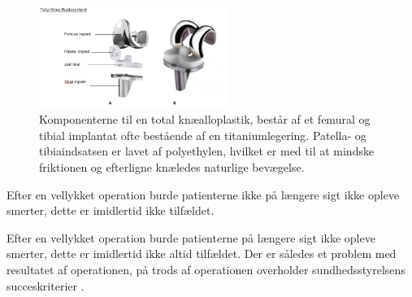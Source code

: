 \begin{figure}[H] 
	\begin{center}
		\includegraphics[width=0.55\textwidth]{../figures/tka_implant}
	\end{center}
	\caption{Komponenterne til en total knæalloplastik, består af et femural og tibial implantat ofte bestående af en titaniumlegering. Patella- og tibiaindsatsen er lavet af polyethylen, hvilket er med til at mindske friktionen og efterligne knæledes naturlige bevægelse. \citep{robodoc2016}} 
	\label{fig:tka_implant} 
\end{figure} \vspace{-.50cm}

Efter en vellykket operation burde patienterne ikke på længere sigt ikke opleve smerter, dette er imidlertid ikke tilfældet.

Efter en vellykket operation burde patienterne på længere sigt ikke opleve smerter, dette er imidlertid ikke altid tilfældet. Der er således et problem med resultatet af operationen, på trods af operationen overholder sundhedsstyrelsens succeskriterier \citep{aarsrapport2016}. 

